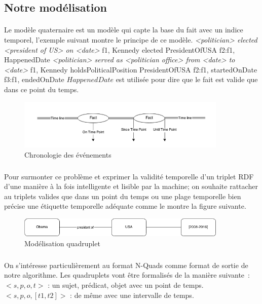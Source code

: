 \documentclass[12pt,a4	]{report}
\begin{document}
\subsection*{Notre modélisation}
\paragraph{}
Le modèle quaternaire est un modèle qui capte la base du fait avec un indice temporel, l'exemple suivant montre le principe de ce modèle.
\newline
{\it <politician> elected <president of US> on <date>}
\newline
f1, Kennedy elected PresidentOfUSA 
\newline
f2:f1, HappenedDate
\newline
{\it <politician> served as <politician office> from <date> to <date>}
\newline
f1, Kennedy holdsPoliticalPosition PresidentOfUSA 
\newline
f2:f1, startedOnDate 
\newline
f3:f1, endedOnDate
\newline
$HappenedDate$ est utilisée pour dire que le fait est valide que dans ce point du temps.
\begin{figure}[H]
        \centering
                \centering
                \includegraphics[width=10cm]{timeline.png}
               \caption{Chronologie des événements}

\end{figure}
\subparagraph{}
Pour surmonter ce problème et exprimer la validité temporelle d’un triplet RDF d’une manière à la fois intelligente et lisible par la machine; on souhaite rattacher au triplets valides que dans un point du temps ou une plage temporelle bien précise une étiquette temporelle adéquate comme le montre la figure suivante.
\begin{figure}[H]
        \centering
                \centering
                \includegraphics[width=10cm]{obamaQuad.png}
               \caption{Modélisation quadruplet}

\end{figure}
\subparagraph{}
On s'intéresse particulièrement au format N-Quads comme format de sortie de notre algorithme. Les quadruplets vont être formalisés de la manière suivante~:
\newline
$<s,p,o,t>$ : un sujet, prédicat, objet avec un point de temps.
\newline
$<s,p,o,[t1,t2]>$ : de même avec une intervalle de temps.
\end{document}
